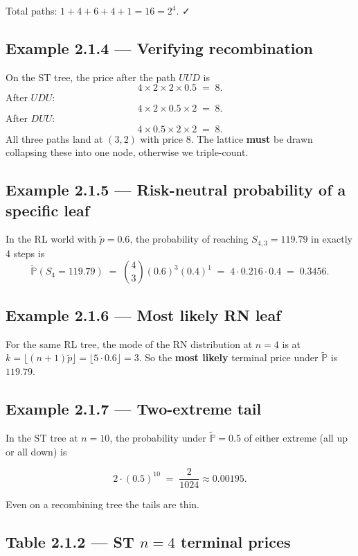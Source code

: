 \documentclass[
  10pt,
  twoside]{book}
\begin{document}
Total paths: \(1+4+6+4+1=16=2^4\). ✓

\subsection{Example 2.1.4 --- Verifying
recombination}\label{example-2.1.4-verifying-recombination}

On the ST tree, the price after the path \(UUD\) is \[
4 \times 2 \times 2 \times 0.5 \;=\; 8.
\] After \(UDU\): \[
4 \times 2 \times 0.5 \times 2 \;=\; 8.
\] After \(DUU\): \[
4 \times 0.5 \times 2 \times 2 \;=\; 8.
\] All three paths land at \((3,2)\) with price 8. The lattice
\textbf{must} be drawn collapsing these into one node, otherwise we
triple-count.

\subsection{Example 2.1.5 --- Risk-neutral probability of a specific
leaf}\label{example-2.1.5-risk-neutral-probability-of-a-specific-leaf}

In the RL world with \(\tilde p=0.6\), the probability of reaching
\(S_{4,3}=119.79\) in exactly 4 steps is \[
\tilde{\mathbb P}(S_4=119.79) \;=\; \binom{4}{3}(0.6)^3(0.4)^1 \;=\; 4\cdot 0.216\cdot 0.4 \;=\; 0.3456.
\]

\subsection{Example 2.1.6 --- Most likely RN
leaf}\label{example-2.1.6-most-likely-rn-leaf}

For the same RL tree, the mode of the RN distribution at \(n=4\) is at
\(k=\lfloor (n+1)\tilde p\rfloor=\lfloor 5\cdot 0.6\rfloor = 3\). So the
\textbf{most likely} terminal price under \(\tilde{\mathbb P}\) is
\(119.79\).

\subsection{Example 2.1.7 --- Two-extreme
tail}\label{example-2.1.7-two-extreme-tail}

In the ST tree at \(n=10\), the probability under
\(\tilde{\mathbb P}=0.5\) of either extreme (all up or all down) is

\[
2 \cdot (0.5)^{10} \;=\; \frac{2}{1024} \approx 0.00195.
\]

Even on a recombining tree the tails are thin.

\subsection{\texorpdfstring{Table 2.1.2 --- ST \(n=4\) terminal
prices}{Table 2.1.2 --- ST n=4 terminal prices}}\label{table-2.1.2-st-n4-terminal-prices}
\end{document}
